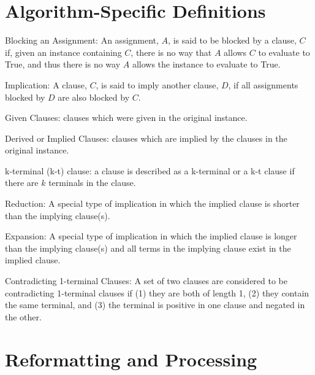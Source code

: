 \documentclass[manuscript]{acmart}
\begin{document}
    \section{Algorithm-Specific Definitions}
    \begin{definition}
        Blocking an Assignment: An assignment, $A$, is said to be blocked by a clause, $C$ if, 
        given an instance containing $C$, there is no way that $A$ allows $C$ to evaluate to True, and
        thus there is no way $A$ allows the instance to evaluate to True.
    \end{definition}
    \begin{definition}
        Implication: A clause, $C$, is said to imply another clause, $D$, if all 
        assignments blocked by $D$ are also blocked by $C$.
    \end{definition}
    \begin{definition}
        Given Clauses: clauses which were given in the original instance.
    \end{definition}
    \begin{definition}
        Derived or Implied Clauses: clauses which are implied by the clauses in the original instance.
    \end{definition}
    \begin{definition}
        k-terminal (k-t) clause: a clause is described as a k-terminal or a k-t clause
        if there are $k$ terminals in the clause.
    \end{definition}
    \begin{definition}
        Reduction: A special type of implication in which the implied 
        clause is shorter than the implying clause(s).
    \end{definition}
    \begin{definition}
        Expansion: A special type of implication in which the 
        implied clause is longer than the implying clause(s) and all terms in the implying
        clause exist in the implied clause.
    \end{definition}
    \begin{definition}
        Contradicting 1-terminal Clauses: A set of two clauses are considered to be contradicting 1-terminal clauses if (1) they are both of length 1, (2) they contain the same terminal, and (3) the terminal is positive in one clause and negated in the other.
    \end{definition}

    \section{Reformatting and Processing}
\end{document}
